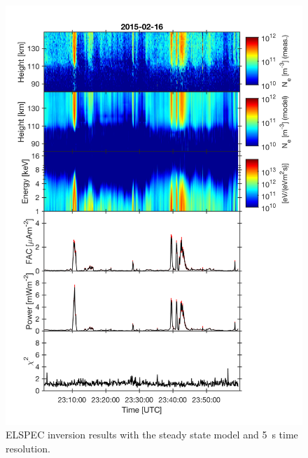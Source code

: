 \documentclass[12pt,a4paper]{report}
\begin{document}
\begin{figure}[ht]
\begin{center}
\includegraphics[width=\textwidth]{ElSpec_20150216T230135-20150216T235955_beata_uhf_Fang_SheehanGr_equilibrium_6_1_dump.png}
\caption{ELSPEC inversion results with the steady state model and 5~s time resolution. }
\label{figElSpecOutEquilibrium}
\end{center}
\end{figure}
\end{document}
